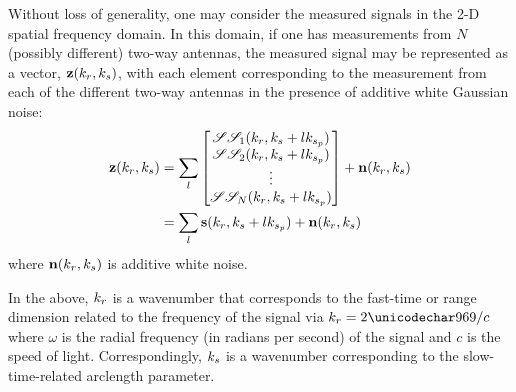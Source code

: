 \par
Without loss of generality, one may consider the measured signals in the 2-D spatial frequency domain. In this domain, if one has measurements from $N$ (possibly different) two-way antennas, the measured signal may be represented as a vector, $\mathbf{z}(k_r, k_{s})$, with each element corresponding to the measurement from each of the different two-way antennas in the presence of additive white Gaussian noise: 
\begin{equation}
\begin{split}
 \mathbf{z}(k_r, k_{s}) &= \sum_l\begin{bmatrix}\mathscr{S}\mathscr{S}_{1}(k_r, k_{s} + lk_{s_p})\\\mathscr{S}\mathscr{S}_{2}(k_r, k_{s} + lk_{s_p})\\\vdots\\\mathscr{S}\mathscr{S}_{N}(k_r, k_{s} + lk_{s_p})\end{bmatrix} + \mathbf{n}(k_r, k_{s})\\
 &= \sum_l\mathbf{s}(k_r, k_{s} + lk_{s_p}) + \mathbf{n}(k_r, k_{s})
 \end{split}
\end{equation}
where $\mathbf{n}(k_r, k_{s})$ is additive white noise.
\par
In the above, $k_r$ is a wavenumber that corresponds to the fast-time or range dimension related to the frequency of the signal via $\kr=2\omega/c$ where $\omega$ is the radial frequency (in radians per second) of the signal and $c$ is the speed of light. Correspondingly, $k_{s}$ is a wavenumber corresponding to the slow-time-related arclength parameter.
